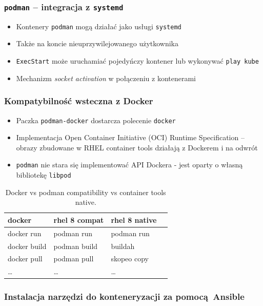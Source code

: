 \documentclass[dvipsnames,table]{beamer}
\begin{document}
\begin{frame}[fragile]
	\frametitle{{\tt podman} -- integracja z {\tt systemd}}
	\begin{itemize}
		\item Kontenery {\tt podman} mogą działać jako usługi {\tt systemd}
		\item Także na koncie nieuprzywilejowanego użytkownika
		\item {\tt ExecStart} może uruchamiać pojedyńczy kontener lub wykonywać {\tt play kube}
		\item Mechanizm {\em socket activation} w połączeniu z kontenerami
	\end{itemize}
%
\end{frame}

\begin{frame}
	\frametitle{Kompatybilność wsteczna z Docker}
	\begin{itemize}
		\item Paczka {\tt podman-docker} dostarcza polecenie {\tt docker}
		\item Implementacja Open Container Initiative (OCI) Runtime Specification -- obrazy zbudowane w RHEL container tools działają z Dockerem i na odwrót
		\item {\tt podman} nie stara się implementować API Dockera - jest oparty o własną bibliotekę {\tt libpod}
	\end{itemize}
\centering
	\begin{table}
\caption{Docker vs podman compatibility vs container tools native.}
\label{porownanie}
\scriptsize
\begin{tabular}{llll}
\hline
docker & rhel 8 compat & rhel 8 native   \\ \hline
	docker run & podman run & podman run \\
	docker build & podman build & buildah  \\
	docker pull & podman pull & skopeo copy \\ 
	\ldots & \ldots & \ldots \\ \hline
\end{tabular}
\normalsize
\end{table}
\end{frame}

\begin{frame}[fragile]
	\frametitle{Instalacja narzędzi do konteneryzacji za pomocą Ansible}
%	
\end{frame}
\end{document}
